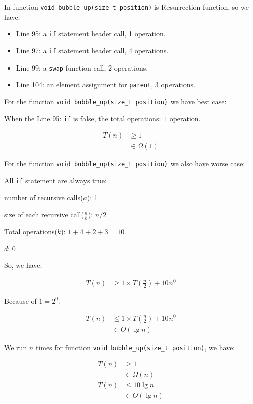 \documentclass[11pt]{article}
\begin{document}
In function \texttt{void bubble\_up(size\_t position)} is Resurrection function, 
so we have:

\begin{itemize}
    \item Line 95: a \texttt{if} statement header call, 1 operation.
    \item Line 97: a \texttt{if} statement header call, 4 operations.
    \item Line 99: a \texttt{swap} function call, 2 operations.
    \item Line 104: an element assignment for \texttt{parent}, 3 operations.
\end{itemize}

For the function \texttt{void bubble\_up(size\_t position)} we have best case:

When the Line 95: \texttt{if} is false, the total operations: $1$ operation.

\begin{align*}
    T(n) &\geq 1 \\
         &\in \Omega(1)
\end{align*}

For the function \texttt{void bubble\_up(size\_t position)} we also have worse case:

All \texttt{if} statement are always true:

number of recursive calls($a$): 1

size of each recursive call($\frac{n}{b}$): $n/2$

Total operations($k$): $1 + 4 + 2 + 3 = 10$

$d$: 0

So, we have:

\begin{align*}
    T(n) & \geq 1 \times T(\frac{n}{2}) + 10n^0
\end{align*}

Because of $1 = 2^0$:

\begin{align*}
    T(n) & \leq 1 \times T(\frac{n}{2}) + 10n^0 \\
         & \in O(\lg n) 
\end{align*}

We run $n$ times for function 
\texttt{void bubble\_up(size\_t position)}, we have:

\begin{align*}
    T(n) &\geq 1 \\
         &\in \Omega(n) \\
    T(n) & \leq 10\lg n \\
         & \in O(\lg n) 
\end{align*}
\end{document}
